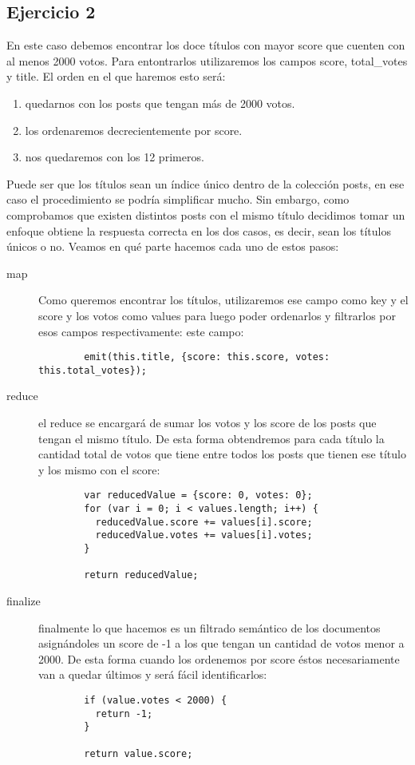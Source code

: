 \subsection{Ejercicio 2}
En este caso debemos encontrar los doce títulos con mayor score que cuenten
con al menos 2000 votos. Para entontrarlos utilizaremos los campos score,
total\_votes y title. El orden en el que haremos esto será:
\begin{enumerate}
  \item quedarnos con los posts que tengan más de 2000 votos.
  \item los ordenaremos decrecientemente por score.
  \item nos quedaremos con los 12 primeros.
\end{enumerate}
Puede ser que los títulos sean un índice único dentro de la colección
posts, en ese caso el procedimiento se podría simplificar mucho. Sin embargo,
como comprobamos que existen distintos posts con el mismo título decidimos
tomar un enfoque obtiene la respuesta correcta en los dos casos, es decir,
sean los títulos únicos o no.
Veamos en qué parte hacemos cada uno de estos pasos:
\begin{description}
  \item[map] Como queremos encontrar los títulos, utilizaremos ese
    campo como key y el score y los votos como values para luego poder 
    ordenarlos y filtrarlos por esos campos respectivamente:
    este campo:
      \begin{lstlisting}
        emit(this.title, {score: this.score, votes: this.total_votes});
      \end{lstlisting}
  \item[reduce] el reduce se encargará de sumar los votos y los score de
    los posts que tengan el mismo título. De esta forma obtendremos para
    cada título la cantidad total de votos que tiene entre todos los
    posts que tienen ese título y los mismo con el score:
      \begin{lstlisting}
        var reducedValue = {score: 0, votes: 0};
        for (var i = 0; i < values.length; i++) {
          reducedValue.score += values[i].score;
          reducedValue.votes += values[i].votes;
        }

        return reducedValue;
      \end{lstlisting}
  \item[finalize] finalmente lo que hacemos es un filtrado semántico de los
    documentos asignándoles un score de -1 a los que tengan un cantidad
    de votos menor a 2000. De esta forma cuando los ordenemos por score éstos
    necesariamente van a quedar últimos y será fácil identificarlos:
      \begin{lstlisting}
        if (value.votes < 2000) {
          return -1;
        }

        return value.score;
      \end{lstlisting}
\end{description}
